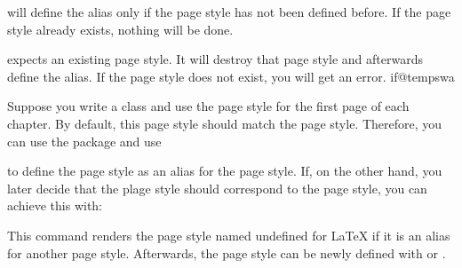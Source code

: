  will define the alias only if the
 page style has not been defined before. If the
 page style already exists, nothing will be done.

 expects an existing
 page style. It will destroy that page style and
afterwards define the alias. If the  page style
does not exist, you will get an error.%
%
\csname if@tempswa\endcsname%
  \begin{Example}
    Suppose you write a class and use the  page style for the
    first page of each chapter. By default, this page style should match the
     page style. Therefore, you can use the 
    package and use
\begin{lstcode}
\end{lstcode}
    to define the  page style as an alias for the
     page style. If, on the other hand, you later decide that
    the  plage style should correspond to the
     page style, you can achieve this with:
\begin{lstcode}
\end{lstcode}%
  \end{Example}%
\fi
\EndIndexGroup


\begin{Declaration}
\end{Declaration}
%
%
This command renders the page style named  undefined
for \LaTeX{} if it is an alias for another page style. Afterwards, the page
style can be newly defined with
 or
.%
\iffalse %
\par
This command is intended to be used inside the argument code of
\DescRef{\LabelBase.cmd.scrlayerOnAutoRemoveInterface} to remove page styles
that have been declared as part of an end-user interface when removing this
interface automatically.%
\fi%
\EndIndexGroup


